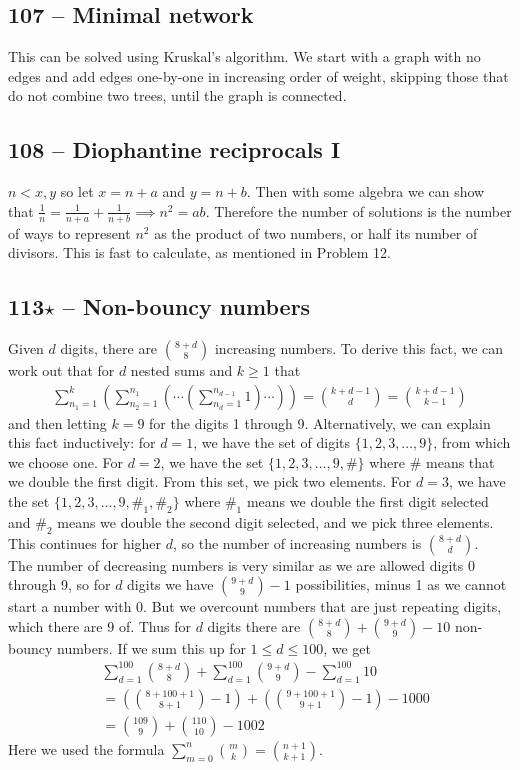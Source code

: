 \documentclass{article}
\begin{document}
\subsection*{107 -- Minimal network} 
This can be solved using Kruskal's algorithm. 
We start with a graph with no edges and add edges one-by-one in increasing order of weight, skipping those that do not combine two trees, until the graph is connected.

\subsection*{108 -- Diophantine reciprocals I} 
$n < x, y$ so let $x = n+a$ and $y = n+b$. 
Then with some algebra we can show that $\frac{1}{n} = \frac{1}{n+a} + \frac{1}{n+b} \implies n^2 = ab$. 
Therefore the number of solutions is the number of ways to represent $n^2$ as the product of two numbers, or half its number of divisors.
This is fast to calculate, as mentioned in Problem 12.

\subsection*{113$\star$ -- Non-bouncy numbers} 
Given $d$ digits, there are $\binom{8+d}{8}$ increasing numbers. 
To derive this fact, we can work out that for $d$ nested sums and $k \geq 1$ that
\begin{align*}
	\sum_{n_1=1}^k \left( \sum_{n_2=1}^{n_1} \left( \cdots \left(\sum_{n_d=1}^{n_{d-1}} 1\right) \cdots \right) \right) = \binom{k+d-1}{d} = \binom{k+d-1}{k-1}
\end{align*}
and then letting $k=9$ for the digits 1 through 9. 
Alternatively, we can explain this fact inductively: for $d=1$, we have the set of digits $\{1, 2, 3, \dotsc, 9\}$, from which we choose one. 
For $d=2$, we have the set $\{1, 2, 3, \dotsc, 9, \#\}$ where $\#$ means that we double the first digit.
From this set, we pick two elements. 
For $d=3$, we have the set $\{1, 2, 3, \dotsc, 9, \#_1, \#_2\}$ where $\#_1$ means we double the first digit selected and $\#_2$ means we double the second digit selected, and we pick three elements.
This continues for higher $d$, so the number of increasing numbers is $\binom{8+d}{d}$.\\

The number of decreasing numbers is very similar as we are allowed digits 0 through 9, so for $d$ digits we have $\binom{9+d}{9}-1$ possibilities, minus 1 as we cannot start a number with 0. 
But we overcount numbers that are just repeating digits, which there are 9 of.
Thus for $d$ digits there are $\binom{8+d}{8} + \binom{9+d}{9} - 10$ non-bouncy numbers. 
If we sum this up for $1 \leq d \leq 100$, we get 
\begin{align*}
	& \sum_{d=1}^{100} \binom{8+d}{8} + \sum_{d=1}^{100} \binom{9+d}{9} - \sum_{d=1}^{100} 10 \\
	& = \left( \binom{8+100+1}{8+1} - 1 \right) + \left( \binom{9+100+1}{9+1} - 1 \right) - 1000 \\
	& = \boxed{ \binom{109}{9} + \binom{110}{10} - 1002 }
\end{align*}
Here we used the formula $\sum\limits_{m=0}^n \binom{m}{k} = \binom{n+1}{k+1}$.
\end{document}
